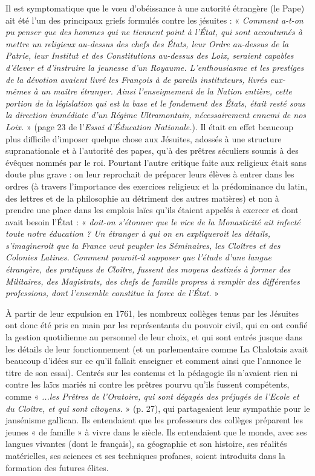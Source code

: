Il est symptomatique que le vœu d'obéissance à une autorité étrangère (le Pape) ait été l'un des principaux griefs formulés contre les jésuites :
 « \emph{Comment a-t-on pu penser que des hommes qui ne tiennent point à l'État, qui sont accoutumés à mettre un religieux au-dessus des chefs des États, leur Ordre au-dessus de la Patrie, leur Institut et des Constitutions au-dessus des Loix, seraient capables d'élever et d'instruire la jeunesse d'un Royaume. L'enthousiasme et les prestiges de la dévotion avaient livré les François à de pareils instituteurs, livrés eux-mêmes à un maître étranger. Ainsi l'enseignement de la Nation entière, cette portion de la législation qui est la base et le fondement des États, était resté sous la direction immédiate d'un Régime Ultramontain, nécessairement ennemi de nos Loix.} » (page 23 de l'\emph{Essai d'Éducation Nationale.}).  Il était en effet beaucoup plus difficile d'imposer quelque chose aux Jésuites, adossés à une structure supranationale et à l'autorité des papes, qu'à des prêtres séculiers soumis à des évêques nommés par le roi. Pourtant l'autre critique faite aux religieux était sans doute plus grave : on leur reprochait de préparer leurs élèves à entrer dans les ordres (à travers l'importance des exercices religieux et la prédominance du latin, des lettres et de la philosophie au détriment des autres matières) et non à prendre une place dans les emplois laïcs qu'ils étaient appelés à exercer et dont avait besoin l'État : « \emph{doit-on s'étonner que le vice de la Monasticité ait infecté toute notre éducation ? Un étranger à qui on en expliqueroit les détails, s'imagineroit que la France veut peupler les Séminaires, les Cloîtres et des Colonies Latines. Comment pouroit-il supposer que l'étude d'une langue étrangère, des pratiques de Cloître, fussent des moyens destinés à former des Militaires, des Magistrats, des chefs de famille propres à remplir des différentes professions, dont l'ensemble constitue la force de l'État.} »
 
 À partir de leur expulsion en 1761, les nombreux collèges tenus par les Jésuites ont donc été pris en main par les représentants du pouvoir civil, qui en ont confié la gestion quotidienne au personnel de leur choix, et qui sont entrés jusque dans les détails de leur fonctionnement (et un parlementaire comme La Chalotais avait beaucoup d'idées sur ce qu'il fallait enseigner et comment ainsi que l'annonce le titre de son essai). Centrés sur les contenus et la pédagogie ils n'avaient rien ni contre les laïcs mariés ni contre les prêtres pourvu qu'ils fussent compétents, comme « \emph{...les Prêtres de l'Oratoire, qui sont dégagés des préjugés de l'Ecole et du Cloître, et qui sont citoyens.} » (p. 27), qui partageaient leur sympathie pour le jansénisme gallican. Ils entendaient que les professeurs des collèges préparent les jeunes « de famille » à vivre dans le siècle. Ils entendaient que le monde, avec ses langues vivantes (dont le français), sa géographie et son histoire, ses réalités matérielles, ses sciences et ses techniques profanes, soient introduits dans la formation des futures élites. 
 
